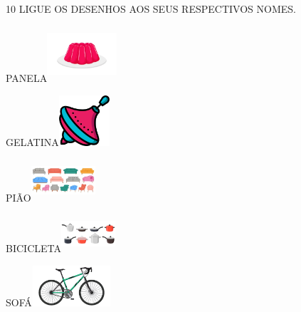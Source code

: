 
\num{10} LIGUE OS DESENHOS AOS SEUS RESPECTIVOS NOMES.

PANELA\includegraphics[width=1.02083in,height=0.81667in]{media/image43.png}

GELATINA\includegraphics[width=0.75000in,height=0.73958in]{media/image44.png}

PIÃO\includegraphics[width=0.93750in,height=0.62014in]{media/image45.jpg}

BICICLETA\includegraphics[width=0.79167in,height=0.55208in]{media/image46.png}

SOFÁ\includegraphics[width=1.16667in,height=0.59375in]{media/image48.png}



